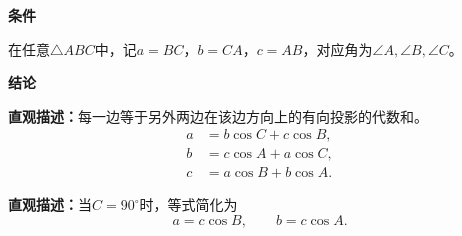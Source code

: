 \begin{statementbox}
	\textbf{\textcolor{CStatement}{条件}}
	\begin{description}[style=nextline, leftmargin=2.8em, labelsep=0.5em, itemsep=0.35em]
		\item[\textbf{\textcolor{CStatement}{条件1（三角形设定）：}}] 在任意$\triangle ABC$中，记$a=BC$，$b=CA$，$c=AB$，对应角为$\angle A,\angle B,\angle C$。
	\end{description}

	\textbf{\textcolor{CStatement}{结论}}
	\begin{description}[style=nextline, leftmargin=2.8em, labelsep=0.5em, itemsep=0.45em]
		\item[\textbf{\textcolor{CStatement}{结论一（射影定理）：}}]
		      \textbf{\textcolor{CStatement}{直观描述：}}每一边等于另外两边在该边方向上的有向投影的代数和。
		      \[
			      \begin{aligned}
				      a & = b\cos C + c\cos B, \\
				      b & = c\cos A + a\cos C, \\
				      c & = a\cos B + b\cos A.
			      \end{aligned}
		      \]

		\item[\textbf{\textcolor{CStatement}{特例（直角三角形）：}}]
		      \textbf{\textcolor{CStatement}{直观描述：}}当$C=90^\circ$时，等式简化为
		      \[
			      a = c\cos B,\qquad b = c\cos A.
		      \]
	\end{description}
\end{statementbox}